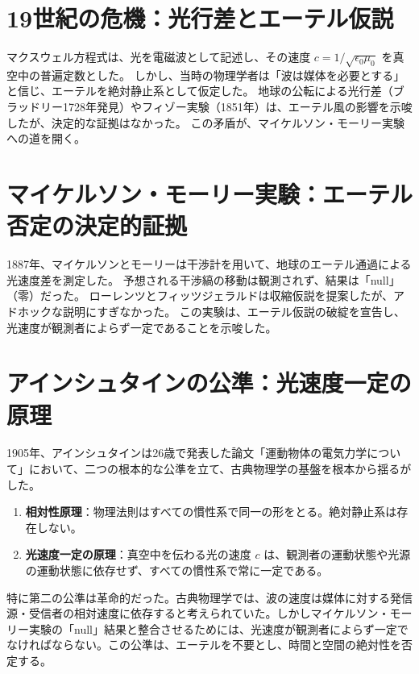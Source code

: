 \documentclass[dvipdfmx,a4paper]{jsbook}
\theoremstyle{definition}
\theoremstyle{remark}
\begin{document}
\section{19世紀の危機：光行差とエーテル仮説}
\label{sec:ether-hypothesis}

マクスウェル方程式は、光を電磁波として記述し、その速度 $c = 1/\sqrt{\epsilon_0 \mu_0}$ を真空中の普遍定数とした。
しかし、当時の物理学者は「波は媒体を必要とする」と信じ、エーテルを絶対静止系として仮定した。
地球の公転による光行差（ブラッドリー1728年発見）やフィゾー実験（1851年）は、エーテル風の影響を示唆したが、決定的な証拠はなかった。
この矛盾が、マイケルソン・モーリー実験への道を開く。

\section{マイケルソン・モーリー実験：エーテル否定の決定的証拠}
\label{sec:michelson-morley}

1887年、マイケルソンとモーリーは干渉計を用いて、地球のエーテル通過による光速度差を測定した。
予想される干渉縞の移動は観測されず、結果は「null」（零）だった。
ローレンツとフィッツジェラルドは収縮仮説を提案したが、アドホックな説明にすぎなかった。
この実験は、エーテル仮説の破綻を宣告し、光速度が観測者によらず一定であることを示唆した。

\section{アインシュタインの公準：光速度一定の原理}
\label{sec:einstein-postulates}

1905年、アインシュタインは26歳で発表した論文「運動物体の電気力学について」において、二つの根本的な公準を立て、古典物理学の基盤を根本から揺るがした。

\begin{enumerate}
  \item \textbf{相対性原理}：物理法則はすべての慣性系で同一の形をとる。絶対静止系は存在しない。
  \item \textbf{光速度一定の原理}：真空中を伝わる光の速度 $c$ は、観測者の運動状態や光源の運動状態に依存せず、すべての慣性系で常に一定である。
\end{enumerate}

特に第二の公準は革命的だった。古典物理学では、波の速度は媒体に対する発信源・受信者の相対速度に依存すると考えられていた。しかしマイケルソン・モーリー実験の「null」結果と整合させるためには、光速度が観測者によらず一定でなければならない。この公準は、エーテルを不要とし、時間と空間の絶対性を否定する。
\end{document}
